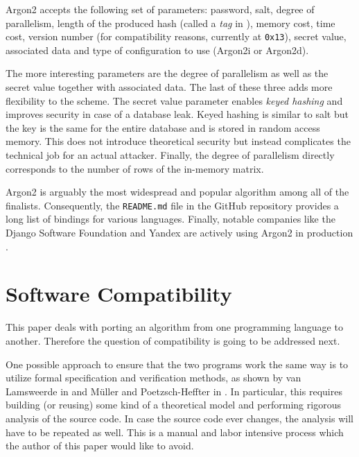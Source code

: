 Argon2 accepts the following set of parameters: password, salt, degree of parallelism, length of the produced hash (called a \emph{tag} in \cite{biryukov:2015:argon2}), memory cost, time cost, version number (for compatibility reasons, currently at \texttt{0x13}), secret value, associated data and type of configuration to use (Argon2i or Argon2d).

The more interesting parameters are the degree of parallelism as well as the secret value together with associated data. The last of these three adds more flexibility to the scheme. The secret value parameter enables \emph{keyed hashing} \cite{223865} and improves security in case of a database leak. Keyed hashing is similar to salt but the key is the same for the entire database and is stored in random access memory. This does not introduce theoretical security but instead complicates the technical job for an actual attacker. Finally, the degree of parallelism directly corresponds to the number of rows of the in-memory matrix.

Argon2 is arguably the most widespread and popular algorithm among all of the finalists. Consequently, the \texttt{README.md} file in the GitHub repository \cite{github:2017:argon2} provides a long list of bindings for various languages. Finally, notable companies like the Django Software Foundation and Yandex are actively using Argon2 in production \cite{django:2017:argon2, github:2017:argonische}.

\section{Software Compatibility}
\label{sec:software-compatibility}
\label{sec:unit-testing-fundamentals}

This paper deals with porting an algorithm from one programming language to another. Therefore the question of compatibility is going to be addressed next.

One possible approach to ensure that the two programs work the same way is to utilize formal specification and verification methods, as shown by van Lamsweerde in \cite{lamsweerde:2000:formal-specification} and Müller and Poetzsch-Heffter in \cite{mueller:1994:formal-specification}. In particular, this requires building (or reusing) some kind of a theoretical model and performing rigorous analysis of the source code. In case the source code ever changes, the analysis will have to be repeated as well. This is a manual and labor intensive process which the author of this paper would like to avoid.

